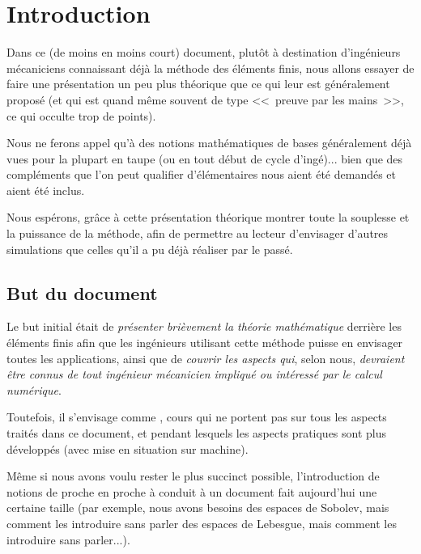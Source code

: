 \documentclass[11pt,pdflatex]{book}
\begin{document}
\chapter*{Introduction}

Dans ce (de moins en moins court) document, plutôt à destination d'ingénieurs
mécaniciens connaissant déjà la méthode des éléments finis,
nous allons essayer de faire une présentation un peu plus théorique que ce qui 
leur est généralement proposé (et qui est quand même souvent de type 
<<~preuve par les mains~>>, ce qui occulte trop de points).

Nous ne ferons appel qu'à des notions mathématiques de bases généralement 
déjà vues pour la plupart en taupe (ou en tout début de cycle d'ingé)... bien
que des compléments que l'on peut qualifier d'élémentaires nous aient été
demandés et aient été inclus.

Nous espérons, grâce à cette présentation théorique
montrer toute la souplesse et la puissance de la méthode, afin
de permettre au lecteur d'envisager d'autres simulations que celles
qu'il a pu déjà réaliser par le passé.





\bigskip
\section*{But du document}

Le but initial était de \emph{présenter brièvement la théorie mathématique} derrière
les éléments finis afin que les ingénieurs utilisant cette méthode puisse en envisager
toutes les applications, ainsi que de \emph{couvrir les aspects qui}, selon nous, \emph{devraient être
connus de tout ingénieur mécanicien impliqué ou intéressé par le calcul numérique}.

Toutefois, il s'envisage comme , 
cours qui ne portent pas sur tous les aspects traités dans ce document, et pendant lesquels les aspects 
pratiques sont plus développés (avec mise en situation sur machine).

\medskip
Même si nous avons voulu rester le plus succinct possible, l'introduction de
notions de proche en proche à conduit à un document fait aujourd'hui une
certaine taille (par exemple, nous avons besoins des espaces de Sobolev, mais
comment les introduire sans parler des espaces de Lebesgue, mais comment
les introduire sans parler...).
\end{document}
